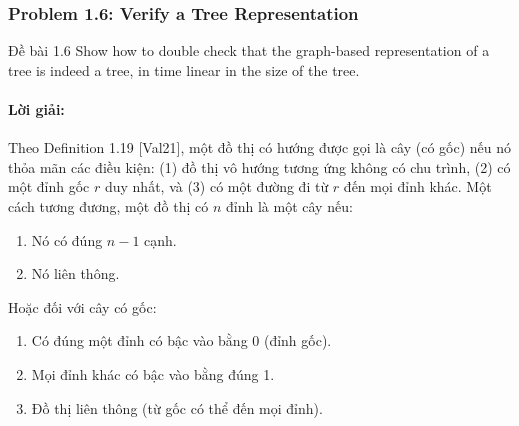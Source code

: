 \documentclass[a4paper,12pt]{article}
\begin{document}
\subsubsection{Problem 1.6: Verify a Tree Representation}
\begin{problembox}{Đề bài 1.6}
    Show how to double check that the graph-based representation of a tree is indeed a tree, in time linear in the size of the tree.
\end{problembox}
\paragraph{Lời giải:}
Theo Definition 1.19 [Val21], một đồ thị có hướng được gọi là cây (có gốc) nếu nó thỏa mãn các điều kiện: (1) đồ thị vô hướng tương ứng không có chu trình, (2) có một đỉnh gốc $r$ duy nhất, và (3) có một đường đi từ $r$ đến mọi đỉnh khác. Một cách tương đương, một đồ thị có $n$ đỉnh là một cây nếu:
\begin{enumerate}
    \item Nó có đúng $n-1$ cạnh.
    \item Nó liên thông.
\end{enumerate}
Hoặc đối với cây có gốc:
\begin{enumerate}
    \item Có đúng một đỉnh có bậc vào bằng 0 (đỉnh gốc).
    \item Mọi đỉnh khác có bậc vào bằng đúng 1.
    \item Đồ thị liên thông (từ gốc có thể đến mọi đỉnh).
\end{enumerate}
\end{document}
